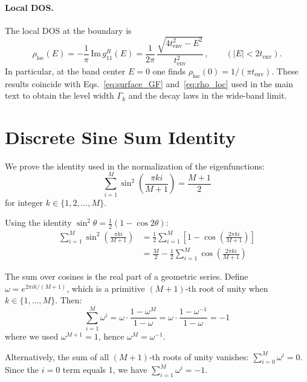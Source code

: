 \documentclass[12pt,oneside,openright]{report}
\theoremstyle{definition}
\theoremstyle{plain}
\theoremstyle{remark}
\begin{document}
\paragraph{Local DOS.}
The local DOS at the boundary is
\begin{equation}
 \rho_{\mathrm{loc}}(E) = -\frac{1}{\pi} \, \mathrm{Im}\, g^{R}_{11}(E)
 = \frac{1}{2\pi} \, \frac{\sqrt{4 t_{\mathrm{env}}^{2} - E^{2}}}{t_{\mathrm{env}}^{2}}\,, \qquad (|E|<2 t_{\mathrm{env}}).
 \label{app:eq:rho_loc}
\end{equation}
In particular, at the band center $E=0$ one finds $\rho_{\mathrm{loc}}(0) = 1/(\pi t_{\mathrm{env}})$. These results coincide with Eqs.~\eqref{eq:surface_GF} and~\eqref{eq:rho_loc} used in the main text to obtain the level width $\Gamma_k$ and the decay laws in the wide-band limit.

\section{Discrete Sine Sum Identity}
\label{app:sine_identity}

We prove the identity used in the normalization of the eigenfunctions:
\begin{equation}
\sum_{i=1}^M \sin^2\left(\frac{\pi k i}{M+1}\right) = \frac{M+1}{2}
\end{equation}
for integer $k \in \{1, 2, \ldots, M\}$.

Using the identity $\sin^2\theta = \frac{1}{2}(1 - \cos 2\theta)$:
\begin{align}
\sum_{i=1}^M \sin^2\left(\frac{\pi k i}{M+1}\right) &= \frac{1}{2}\sum_{i=1}^M \left[1 - \cos\left(\frac{2\pi k i}{M+1}\right)\right] \nonumber\\
&= \frac{M}{2} - \frac{1}{2}\sum_{i=1}^M \cos\left(\frac{2\pi k i}{M+1}\right)
\end{align}

The sum over cosines is the real part of a geometric series. Define $\omega = e^{2\pi i k/(M+1)}$, which is a primitive $(M+1)$-th root of unity when $k \in \{1, \ldots, M\}$. Then:
\begin{equation}
\sum_{i=1}^M \omega^i = \omega \cdot \frac{1 - \omega^M}{1 - \omega} = \omega \cdot \frac{1 - \omega^{-1}}{1 - \omega} = -1
\end{equation}
where we used $\omega^{M+1} = 1$, hence $\omega^M = \omega^{-1}$.

Alternatively, the sum of all $(M+1)$-th roots of unity vanishes: $\sum_{i=0}^{M} \omega^i = 0$. Since the $i=0$ term equals 1, we have $\sum_{i=1}^M \omega^i = -1$.
\end{document}
